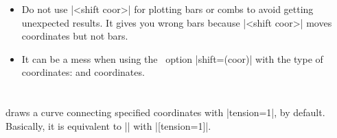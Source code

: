 \begin{tzcode}{.3}
\end{tzcode}

\remark
\begin{itemize}
\item
Do not use |<shift coor>| for plotting bars or combs to avoid getting unexpected results. It gives you wrong bars because |<shift coor>| moves coordinates but not bars. 


\item
It can be a mess when using the \Tikz\ option |shift={(coor)}| with the type of  coordinates:  and  coordinates.


\end{itemize}



\section{\protect\cmd{\tzplotcurve(*)}}
\label{s:tzplotcurve}

\icmd{\tzplotcurve} draws a curve connecting specified coordinates with |tension=1|, by default. Basically, it is equivalent to |\tzplot| with |[tension=1]|.

